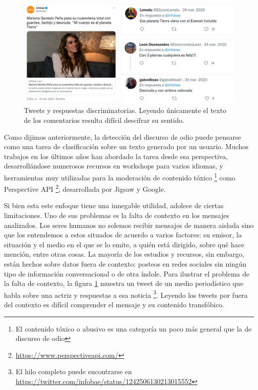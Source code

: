 \begin{figure}
    \centering
    \includegraphics[width=\textwidth]{img/01/tweets_contexto.pdf}
    \caption{Tweets y respuestas discriminatorias. Leyendo únicamente el texto de los comentarios resulta difícil descifrar su sentido. }
    \label{fig:01_tweets_y_su_contexto}
\end{figure}

Como dijimos anteriormente, la detección del discurso de odio puede pensarse como una tarea de clasificación sobre un texto generado por un usuario. Muchos trabajos en los últimos años han abordado la tarea desde esa perspectiva, desarrollándose numerosos recursos en workshops para varios idiomas, y herramientas muy utilizadas para la moderación de contenido tóxico \footnote{El contenido tóxico o abusivo es una categoría un poco más general que la de discurso de odio} como Perspective API \footnote{\url{https://www.perspectiveapi.com/}}, desarrollada por Jigsaw y Google.

Si bien esta este enfoque tiene una innegable utilidad, adolece de ciertas limitaciones. Uno de sus problemas es la falta de contexto en los mensajes analizados. Los seres humanos no solemos recibir mensajes de manera aislada sino que los entendemos a estos situados de acuerdo a varios factores: su emisor, la situación y el medio en el que se lo emite, a quién está dirigido, sobre qué hace mención, entre otras cosas. La mayoría de los estudios y recursos, sin embargo, están hechos sobre datos fuera de contexto: posteos en redes sociales sin ningún tipo de información  conversacional o de otra índole. Para ilustrar el problema de la falta de contexto, la figura \ref{fig:01_tweets_y_su_contexto} muestra un tweet de un medio periodístico que habla sobre una actriz y respuestas a esa noticia \footnote{El hilo completo puede encontrarse en \url{https://twitter.com/infobae/status/1242506130213015552}}. Leyendo los tweets por fuera del contexto es difícil comprender el mensaje y su contenido transfóbico.

